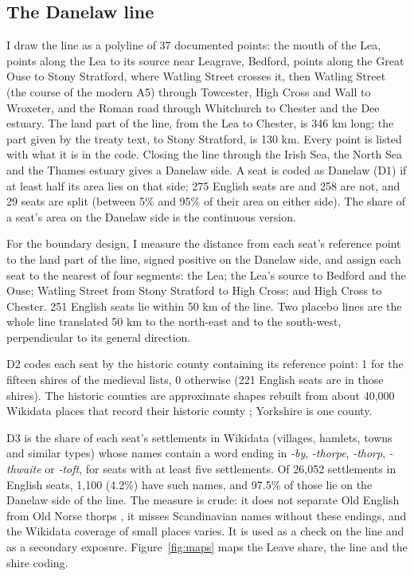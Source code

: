 \documentclass[11pt,a4paper]{article}
\begin{document}
\subsection{The Danelaw line}
I draw the line as a polyline of 37 documented points: the mouth of the Lea, points along the Lea to its source near Leagrave, Bedford, points along the Great Ouse to Stony Stratford, where Watling Street crosses it, then Watling Street (the course of the modern A5) through Towcester, High Cross and Wall to Wroxeter, and the Roman road through Whitchurch to Chester and the Dee estuary. The land part of the line, from the Lea to Chester, is 346 km long; the part given by the treaty text, to Stony Stratford, is 130 km. Every point is listed with what it is in the code. Closing the line through the Irish Sea, the North Sea and the Thames estuary gives a Danelaw side. A seat is coded as Danelaw (D1) if at least half its area lies on that side; 275 English seats are and 258 are not, and 29 seats are split (between 5\% and 95\% of their area on either side). The share of a seat's area on the Danelaw side is the continuous version.

For the boundary design, I measure the distance from each seat's reference point to the land part of the line, signed positive on the Danelaw side, and assign each seat to the nearest of four segments: the Lea; the Lea's source to Bedford and the Ouse; Watling Street from Stony Stratford to High Cross; and High Cross to Chester. 251 English seats lie within 50 km of the line. Two placebo lines are the whole line translated 50 km to the north-east and to the south-west, perpendicular to its general direction.

D2 codes each seat by the historic county containing its reference point: 1 for the fifteen shires of the medieval lists, 0 otherwise (221 English seats are in those shires). The historic counties are approximate shapes rebuilt from about 40,000 Wikidata places that record their historic county \citep{hotham2026enc}; Yorkshire is one county.

D3 is the share of each seat's settlements in Wikidata (villages, hamlets, towns and similar types) whose names contain a word ending in \emph{-by}, \emph{-thorpe}, \emph{-thorp}, \emph{-thwaite} or \emph{-toft}, for seats with at least five settlements. Of 26,052 settlements in English seats, 1,100 (4.2\%) have such names, and 97.5\% of those lie on the Danelaw side of the line. The measure is crude: it does not separate Old English from Old Norse thorps \citep{cullen2011}, it misses Scandinavian names without these endings, and the Wikidata coverage of small places varies. It is used as a check on the line and as a secondary exposure. Figure~\ref{fig:maps} maps the Leave share, the line and the shire coding.
\end{document}
